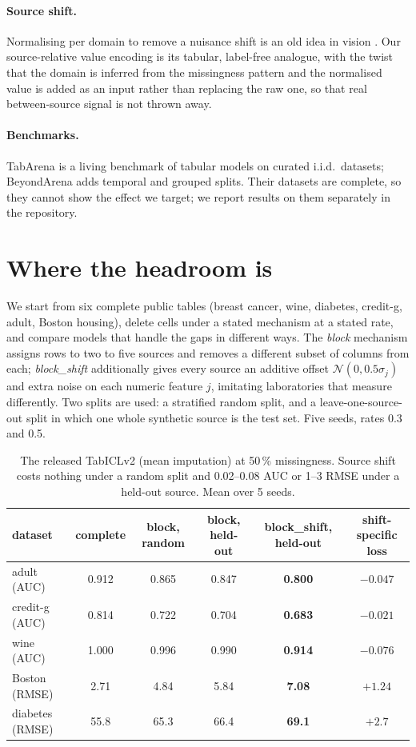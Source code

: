 \documentclass[11pt]{article}
\begin{document}
\paragraph{Source shift.} Normalising per domain to remove a nuisance shift is an old
idea in vision \citep{li2016adabn}. Our source-relative value encoding is its tabular,
label-free analogue, with the twist that the domain is inferred from the missingness
pattern and the normalised value is added as an input rather than replacing the raw
one, so that real between-source signal is not thrown away.

\paragraph{Benchmarks.} TabArena \citep{erickson2025tabarena} is a living benchmark of
tabular models on curated i.i.d.\ datasets; BeyondArena \citep{beyondarena2026} adds
temporal and grouped splits. Their datasets are complete, so they cannot show the
effect we target; we report results on them separately in the repository.

\section{Where the headroom is}
\label{sec:headroom}

We start from six complete public tables (breast cancer, wine, diabetes, credit-g,
adult, Boston housing), delete cells under a stated mechanism at a stated rate, and
compare models that handle the gaps in different ways. The \emph{block} mechanism
assigns rows to two to five sources and removes a different subset of columns from
each; \emph{block\_shift} additionally gives every source an additive offset
$\mathcal N(0, 0.5\sigma_j)$ and extra noise on each numeric feature $j$, imitating
laboratories that measure differently. Two splits are used: a stratified random split,
and a leave-one-source-out split in which one whole synthetic source is the test set.
Five seeds, rates 0.3 and 0.5.

\begin{table}[!htbp]
\centering\small
\caption{The released TabICLv2 (mean imputation) at 50\,\% missingness. Source shift
costs nothing under a random split and 0.02--0.08 AUC or 1--3 RMSE under a held-out
source. Mean over 5 seeds.}
\label{tab:headroom}
\begin{tabular}{lccccc}
\toprule
dataset & complete & block, random & block, held-out & \textbf{block\_shift, held-out} & shift-specific loss\\
\midrule
adult (AUC) & 0.912 & 0.865 & 0.847 & \textbf{0.800} & $-0.047$\\
credit-g (AUC) & 0.814 & 0.722 & 0.704 & \textbf{0.683} & $-0.021$\\
wine (AUC) & 1.000 & 0.996 & 0.990 & \textbf{0.914} & $-0.076$\\
Boston (RMSE) & 2.71 & 4.84 & 5.84 & \textbf{7.08} & $+1.24$\\
diabetes (RMSE) & 55.8 & 65.3 & 66.4 & \textbf{69.1} & $+2.7$\\
\bottomrule
\end{tabular}
\end{table}
\end{document}

